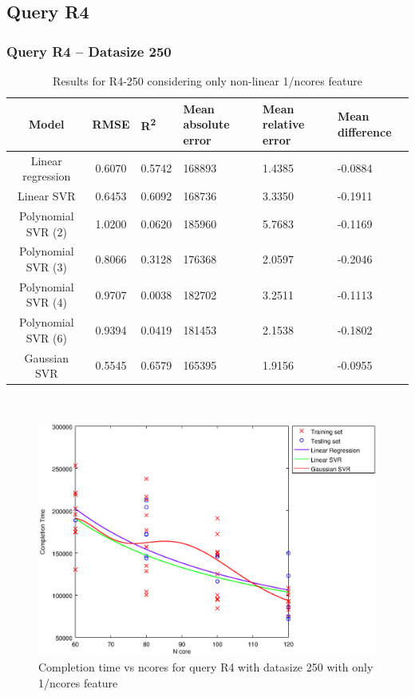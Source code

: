 \documentclass[a4paper,11pt]{article}
\begin{document}
\newpage
\subsection{Query R4}
\subsubsection{Query R4 -- Datasize 250}
\begin{table}[H]
	\centering
	\begin{adjustbox}{center}
		\begin{tabular}{c | c M{1.2cm} M{2.5cm} M{2.5cm} M{1.8cm}}
			Model & RMSE & R\textsuperscript{2} & Mean absolute error & Mean relative error & Mean difference \tabularnewline
			\hline
			Linear regression & 0.6070 & 0.5742 & 168893 & 1.4385 & -0.0884 \\
			Linear SVR & 0.6453 & 0.6092 & 168736 & 3.3350 & -0.1911 \\
			Polynomial SVR (2) & 1.0200 & 0.0620 & 185960 & 5.7683 & -0.1169 \\
			Polynomial SVR (3) & 0.8066 & 0.3128 & 176368 & 2.0597 & -0.2046 \\
			Polynomial SVR (4) & 0.9707 & 0.0038 & 182702 & 3.2511 & -0.1113 \\
			Polynomial SVR (6) & 0.9394 & 0.0419 & 181453 & 2.1538 & -0.1802 \\
			Gaussian SVR & 0.5545 & 0.6579 & 165395 & 1.9156 & -0.0955 \\
		\end{tabular}
	\end{adjustbox}
	\\
	\caption{Results for R4-250 considering only non-linear 1/ncores feature}
	\label{table_R4_prediction_all}
\end{table}

\begin {figure}[hbtp]
\centering
\includegraphics[width=\textwidth]{output/R4_250_ONLY_1_OVER_NCORES/plot_R4_250_bestmodels.eps}
\caption {Completion time vs ncores for query R4 with datasize 250 with only 1/ncores feature}
\end {figure}
\end{document}
